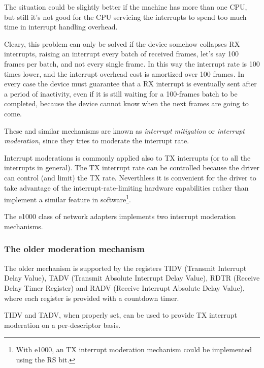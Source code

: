 The situation could be slightly better if the machine has more than one CPU, but still it's not good for the CPU servicing the interrupts
to spend too much time in interrupt handling overhead.

\vspace{0.5cm}

Cleary, this problem can only be solved if the device somehow collapses RX interrupts, raising an interrupt every batch of received
frames, let's say 100 frames per batch, and not every single frame. In this way the interrupt rate is 100 times lower, and the
interrupt overhead cost is amortized over 100 frames.
In every case the device must guarantee that a RX interrupt is eventually sent after a period of inactivity, even if it is still waiting
for a 100-frames batch to be completed, because the device cannot know when the next frames are going to come.

These and similar mechanisms are known as \emph{interrupt mitigation} or \emph{interrupt moderation}, since they tries to moderate the
interrupt rate.

Interrupt moderations is commonly applied also to TX interrupts (or to all the interrupts in general). The TX interrupt rate can be
controlled because the driver can control (and limit) the TX rate. Neverthless it is convenient for the driver to take advantage of
the interrupt-rate-limiting hardware capabilities rather than implement a similar feature in software\footnote{With e1000, an TX 
interrupt moderation mechanism could be implemented using the RS bit.}.

\vspace{0.5cm}

The e1000 class of network adapters implements two interrupt moderation mechanisms.

\subsubsection{The older moderation mechanism}
\label{sec:oldmit}
The older mechanism is supported by the registers TIDV (Transmit Interrupt Delay Value), TADV (Transmit Absolute Interrupt Delay Value),
RDTR (Receive Delay Timer Register) and RADV (Receive Interrupt Absolute Delay Value), where each register is provided with a countdown
timer.

\vspace{0.5cm}

TIDV and TADV, when properly set, can be used to provide TX interrupt moderation on a per-descriptor basis.

